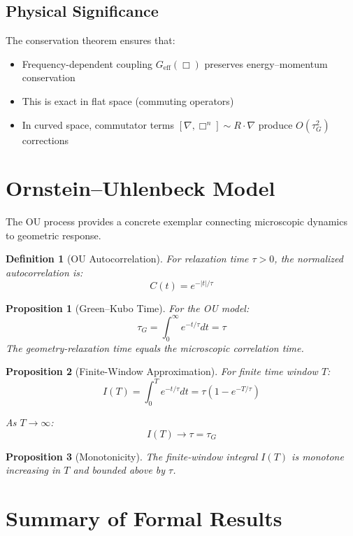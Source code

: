 \documentclass[11pt]{article}
\newtheorem{definition}{Definition}
\newtheorem{proposition}{Proposition}
\begin{document}
\subsection{Physical Significance}

The conservation theorem ensures that:
\begin{itemize}
\item Frequency-dependent coupling $G_{\text{eff}}(\Box)$ preserves energy--momentum conservation
\item This is exact in flat space (commuting operators)
\item In curved space, commutator terms $[\nabla, \Box^n] \sim R \cdot \nabla$ produce $O(\tau_G^2)$ corrections
\end{itemize}

\section{Ornstein--Uhlenbeck Model}

The OU process provides a concrete exemplar connecting microscopic dynamics to geometric response.

\begin{definition}[OU Autocorrelation]
For relaxation time $\tau > 0$, the normalized autocorrelation is:
\[
C(t) = e^{-|t|/\tau}
\]
\end{definition}

\begin{proposition}[Green--Kubo Time]
For the OU model:
\[
\tau_G = \int_0^\infty e^{-t/\tau} dt = \tau
\]
The geometry-relaxation time equals the microscopic correlation time.
\end{proposition}

\begin{proposition}[Finite-Window Approximation]
For finite time window $T$:
\[
I(T) = \int_0^T e^{-t/\tau} dt = \tau (1 - e^{-T/\tau})
\]

As $T \to \infty$:
\[
I(T) \to \tau = \tau_G
\]
\end{proposition}

\begin{proposition}[Monotonicity]
The finite-window integral $I(T)$ is monotone increasing in $T$ and bounded above by $\tau$.
\end{proposition}

\section{Summary of Formal Results}
\end{document}
